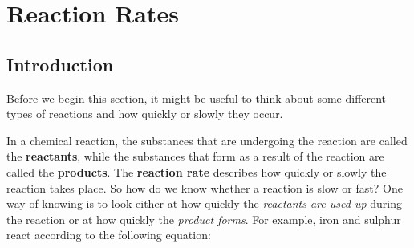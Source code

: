 \chapter{Reaction Rates}
\label{chap:ReactionRates}



\section{Introduction}

Before we begin this section, it might be useful to think about some different types of reactions and how quickly or slowly they occur.


In a chemical reaction, the substances that are undergoing the reaction are called the \textbf{reactants}, while the substances that form as a result of the reaction are called the \textbf{products}. The \textbf{reaction rate} describes how quickly or slowly the reaction takes place. So how do we know whether a reaction is slow or fast? One way of knowing is to look either at how quickly the \textit{reactants are used up} during the reaction or at how quickly the \textit{product forms}. For example, iron and sulphur react according to the following equation:

